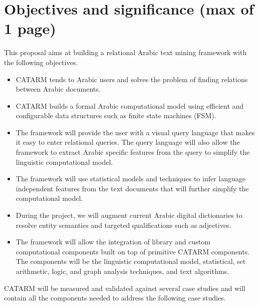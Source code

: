 \documentclass[12pt]{article}
\begin{document}
\pagebreak

\section{Objectives and significance (max of 1 page) } 
\label{s:objectives}

This proposal aims at building  a relational Arabic text mining 
framework with the following objectives.
\begin{itemize}\itemsep0pt
\item CATARM tends to Arabic users and solves the
problem of finding relations between Arabic documents. 
\item CATARM builds a formal Arabic computational model
using efficient and configurable data structures such as 
finite state machines (FSM). 
\item The framework will provide the user with a visual query 
language that makes it easy to enter relational queries. 
The query language will also allow the framework to extract Arabic
specific features from the query to simplify the linguistic 
computational model. 
\item The framework will use statistical models and techniques
to infer language independent features from the text documents
that will further simplify the computational model. 
\item During the project, we will augment current Arabic digital 
dictionaries to resolve entity semantics and targeted 
qualifications such as adjectives.
\item The framework will allow the integration of library and 
custom computational components built on top of primitive
CATARM components. 
The components will be the linguistic computational model,
statistical, set arithmetic, logic,
and graph analysis techniques, and  text algorithms.
\end{itemize}


CATARM will be measured and validated against several 
case studies and will contain  
all the components needed to 
address the following case studies.
\end{document}
